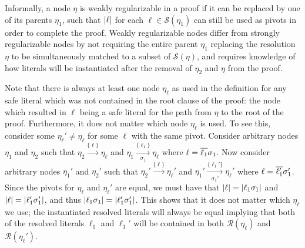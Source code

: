 Informally, a node $\eta$ is weakly regularizable in a proof if it can be replaced by one of its parents $\eta_1$, such that $\lvert\ell\rvert$ for each $\ell \in \mathcal{S}(\eta_1)$ can still be used as pivots in order to complete the proof. Weakly regularizable nodes differ from strongly regularizable nodes by not requiring the entire parent $\eta_1$ replacing the resolution $\eta$ to be simultaneously matched to a subset of $\mathcal{S}(\eta)$, and requires knowledge of how literals will be instantiated after the removal of $\eta_2$ and $\eta$ from the proof.

Note that there is always at least one node $\eta_\ell$ as used in the definition for any safe literal which was not contained in the root clause of the proof: the node which resulted in $\ell$ being a safe literal for the path from $\eta$ to the root of the proof. Furthermore, it does not matter which node $\eta_\ell$ is used. To see this, consider some $\eta_\ell' \neq \eta_\ell$ for some $\ell$ with the same pivot. Consider arbitrary nodes $\eta_1$ and $\eta_2$ such that  $\eta_2 \xrightarrow[ ]{\{\ell\} } \eta_\ell$ and $\eta_1 \xrightarrow[\sigma_1]{\{\ell_1\} } \eta_\ell$ where $\ell=\overline{\ell_1}\sigma_1$. Now consider arbitrary nodes $\eta_1'$ and $\eta_2'$ such that  $\eta_2' \xrightarrow[ ]{\{\ell\} } \eta_\ell'$ and $\eta_1' \xrightarrow[\sigma_1']{\{\ell_1'\} } \eta_\ell'$ where $\ell=\overline{\ell_1'}\sigma_1'$. Since the pivots for $\eta_\ell$ and $\eta_\ell'$ are equal, we must have that %
$\lvert\ell\rvert=\lvert\ell_1\sigma_1\rvert$ and $\lvert\ell\rvert=\lvert\ell_1'\sigma_1'\rvert$, and thus $\lvert\ell_1\sigma_1\rvert=\lvert\ell_1'\sigma_1'\rvert$. This shows that it does not matter which $\eta_\ell$ we use; the instantiated resolved literals will always be equal implying that both of the resolved literals $\ell_1$ and $\ell_1'$ will be contained in both $\mathcal{R}(\eta_\ell)$ and $\mathcal{R}(\eta_\ell')$.


